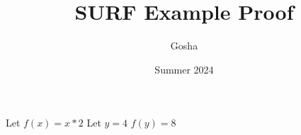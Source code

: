 \documentclass{article}
\title{SURF Example Proof}
\author{Gosha}
\date{Summer 2024}
\begin{document}
\maketitle

Let $f(x) = x * 2$
Let $y = 4$
$f(y) = 8$
\end{document}
